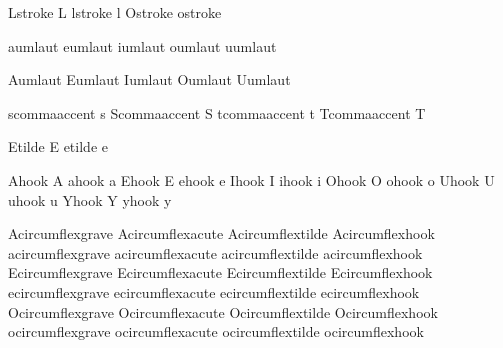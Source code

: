  Lstroke          {L}
 lstroke          {l}
 Ostroke          { } %
 ostroke          { } %

 aumlaut          {\moveaccent{-.1ex}\adiaeresis}
 eumlaut          {\moveaccent{-.1ex}\ediaeresis}
 iumlaut          {\moveaccent{-.1ex}\idiaeresis}
 oumlaut          {\moveaccent{-.1ex}\odiaeresis}
 uumlaut          {\moveaccent{-.1ex}\udiaeresis}

 Aumlaut          {\smashaccent\Adiaeresis}
 Eumlaut          {\smashaccent\Ediaeresis}
 Iumlaut          {\smashaccent\Idiaeresis}
 Oumlaut          {\smashaccent\Odiaeresis}
 Uumlaut          {\smashaccent\Udiaeresis}

 scommaaccent     {s\quoteright}
 Scommaaccent     {S\quoteright}
 tcommaaccent     {t\quoteright}
 Tcommaaccent     {T\quoteright}

 Etilde           {\buildtextaccent\texttilde E}
 etilde           {\buildtextaccent\texttilde e}

 Ahook               {A}
 ahook               {a}
 Ehook               {E}
 ehook               {e}
 Ihook               {I}
 ihook               {i}
 Ohook               {O}
 ohook               {o}
 Uhook               {U}
 uhook               {u}
 Yhook               {Y}
 yhook               {y}

 Acircumflexgrave    {\Acircumflex}
 Acircumflexacute    {\Acircumflex}
 Acircumflextilde    {\Acircumflex}
 Acircumflexhook     {\Acircumflex}
 acircumflexgrave    {\acircumflex}
 acircumflexacute    {\acircumflex}
 acircumflextilde    {\acircumflex}
 acircumflexhook     {\acircumflex}
 Ecircumflexgrave    {\Ecircumflex}
 Ecircumflexacute    {\Ecircumflex}
 Ecircumflextilde    {\Ecircumflex}
 Ecircumflexhook     {\Ecircumflex}
 ecircumflexgrave    {\ecircumflex}
 ecircumflexacute    {\ecircumflex}
 ecircumflextilde    {\ecircumflex}
 ecircumflexhook     {\ecircumflex}
 Ocircumflexgrave    {\Ocircumflex}
 Ocircumflexacute    {\Ocircumflex}
 Ocircumflextilde    {\Ocircumflex}
 Ocircumflexhook     {\Ocircumflex}
 ocircumflexgrave    {\ocircumflex}
 ocircumflexacute    {\ocircumflex}
 ocircumflextilde    {\ocircumflex}
 ocircumflexhook     {\ocircumflex}

